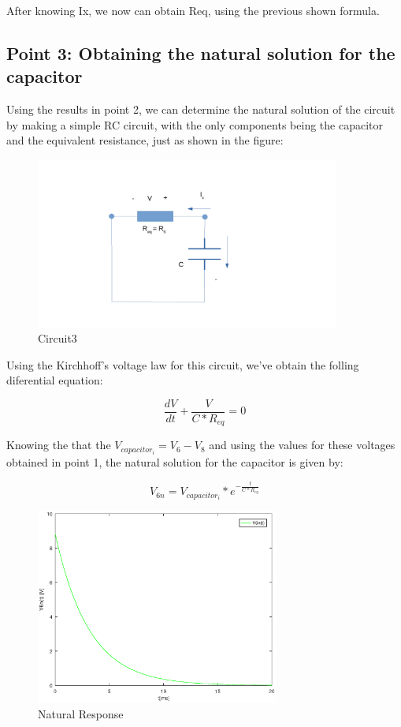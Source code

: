 After knowing Ix, we now can obtain Req, using the previous shown formula.

\subsection{Point 3: Obtaining the natural solution for the capacitor}

Using the results in point 2, we can determine the natural solution of the circuit by making a simple RC circuit, with the only components being the capacitor and the equivalent resistance, just as shown in the figure:

\begin{figure}[H]
\centering
\includegraphics[width = 10cm]{circuit3.pdf}
\caption {Circuit3}
\end{figure}

Using the Kirchhoff's voltage law for this circuit, we've obtain the folling diferential equation:

\begin{equation}
\frac{dV}{dt} + \frac{V}{C*R_{eq}} = 0
\end{equation}

Knowing the that the $V_{capacitor_i} = V_{6} - V_{8}$ and using the values for these voltages obtained in point 1, the natural solution for the capacitor is given by:

\begin{equation}
V_{6n} = V_{capacitor_i} * e^{-\frac{t}{C*R_{eq}}}
\end{equation}

\begin{figure}[H]
\centering
\includegraphics[width = 8cm]{NaturalResponse.eps}
\caption {Natural Response}
\end{figure}



